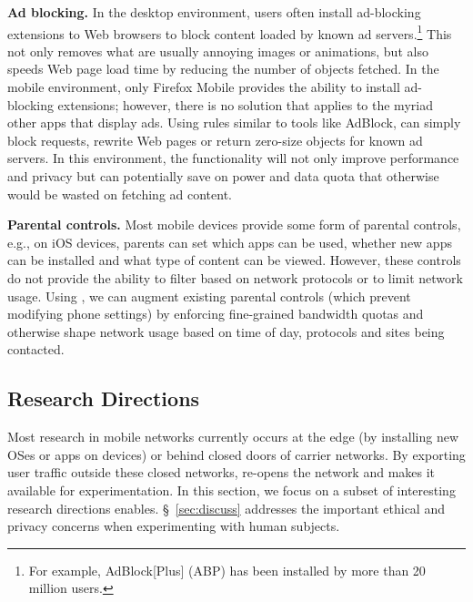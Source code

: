 \noindent\textbf{Ad blocking.} In the desktop environment, users often install ad-blocking extensions to Web 
browsers to 
block content loaded by known ad servers.\footnote{For example, AdBlock[Plus] (ABP) has been installed by more than 20 million users.} 
 This not only removes what are usually annoying 
images or animations, but also speeds Web page load time by reducing the number of 
objects fetched. In the mobile environment, only Firefox Mobile provides the ability to install 
ad-blocking extensions; however, there is no solution that applies to the myriad other apps 
that display ads. Using 
rules similar to tools like AdBlock, \meddle can simply block requests, rewrite Web pages or return zero-size objects 
for known ad servers. In this environment, the functionality 
will not only improve performance and privacy but can potentially save on power and data quota that otherwise 
would be wasted on fetching ad content.


\noindent\textbf{Parental controls.} Most mobile devices provide some
form of parental controls, e.g., on iOS devices, parents can set which
apps can be used, whether new apps can be installed and what type of
content can be viewed. However, these controls do not provide the
ability to filter based on network protocols or to limit network
usage. Using \meddle, we can augment existing parental controls (which
prevent modifying phone settings) by enforcing fine-grained bandwidth
quotas and otherwise shape network usage based on time of day,
protocols and sites being contacted.

\subsection{Research Directions}
Most research in mobile networks currently occurs at the edge (by installing new OSes or apps 
on devices) or behind closed doors of carrier networks. By exporting user traffic outside 
these closed networks, \meddle re-opens the network and makes it available for 
experimentation. In this section, 
we focus on a subset of interesting research directions \meddle enables. \S~\ref{sec:discuss} addresses the important ethical and privacy 
concerns when experimenting with human subjects. 

